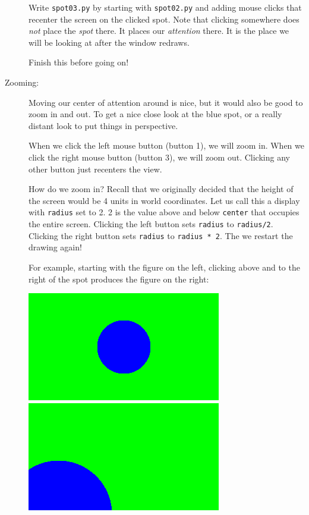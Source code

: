 \documentclass[12pt]{article}
\begin{document}
\begin{description}
Write \lstinline{spot03.py} by starting with 
\lstinline{spot02.py} and adding mouse
clicks that recenter the screen on the clicked
spot.  Note that clicking somewhere does {\em not}
place the {\em spot} there.  It places our {\em attention} there.
It is the place we will be looking at after 
the window redraws.

Finish this before going on! 

\item[Zooming:]
Moving our center of attention around is nice, but
it would also be good to zoom in and out.  To get
a nice close look at the blue spot, or a really
distant look to put things in perspective.

When we click the left mouse button (button 1),
we will zoom in.  When we click the right mouse
button (button 3), we will zoom out.  Clicking
any other button just recenters the view.

How do we zoom in?  Recall that we originally decided
that the height of the screen would be 4 units
in world coordinates.  Let us call this a display
with \lstinline{radius} set to 2.  2 is the value
above and below \lstinline{center} that occupies
the entire screen.  Clicking the left button
sets \lstinline{radius} to \lstinline{radius/2}.
Clicking the right button sets \lstinline{radius}
to \lstinline{radius * 2}.  The we restart the
drawing again!  

For example, starting with the figure on the left,
clicking above and to the right of the spot 
produces the figure on the right:

\includegraphics[scale=0.5]{spot}
\hfill
\includegraphics[scale=0.5]{spot04}


\end{description}
\end{document}

